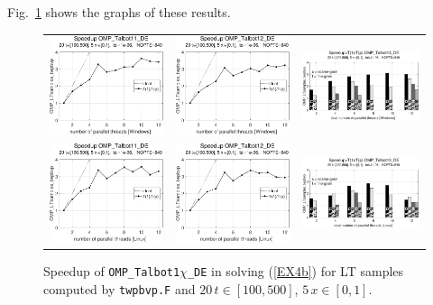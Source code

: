 \documentclass[a4paper,10pt]{report}%
\begin{document}
Fig.~\ref{PAR_EX4b_speedup_twpbvp2} shows the graphs of these results.
\begin{figure}[htb]
\centering
\begin{tabular}{ccc} %
\includegraphics[height=0.2\textwidth]{./FIGS/EX4b/EX4b_twpbvp_speedup_11_20t_100_Windows.eps} &
\includegraphics[height=0.2\textwidth]{./FIGS/EX4b/EX4b_twpbvp_speedup_12_20t_100_Windows.eps} &
\includegraphics[height=0.2\textwidth,keepaspectratio=true]{./FIGS/EX4b/EX4b_twpbvp_speedup_13_20t_100_Windows.eps} \\
\includegraphics[height=0.2\textwidth]{./FIGS/EX4b/EX4b_twpbvp_speedup_11_20t_100_Linux.eps} &
\includegraphics[height=0.2\textwidth]{./FIGS/EX4b/EX4b_twpbvp_speedup_12_20t_100_Linux.eps} &
\includegraphics[height=0.2\textwidth,keepaspectratio=true]{./FIGS/EX4b/EX4b_twpbvp_speedup_13_20t_100_Linux.eps}
\end{tabular}
\caption{\small Speedup of {\tt OMP\_Talbot1$\chi$\_DE} in solving (\ref{EX4b}) for LT samples computed
by {\tt twpbvp.F} and $20\,t\in[100,500]$, $5\,x\in[0,1]$.}
\label{PAR_EX4b_speedup_twpbvp2}
\end{figure}
\end{document}
